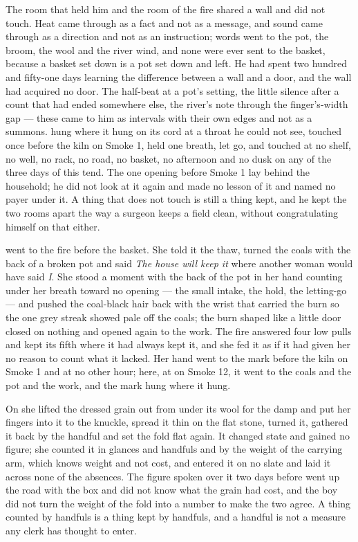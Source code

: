 The room that held him and the room of the fire shared a wall and did not touch. Heat came through as a fact and not as a message, and sound came through as a direction and not as an instruction; words went to the pot, the broom, the wool and the river wind, and none were ever sent to the basket, because a basket set down is a pot set down and left. He had spent two hundred and fifty-one days learning the difference between a wall and a door, and the wall had acquired no door. The half-beat at a pot's setting, the little silence after a count that had ended somewhere else, the river's note through the finger's-width gap --- these came to him as intervals with their own edges and not as a summons.  hung where it hung on its cord at a throat he could not see, touched once before the kiln on Smoke 1, held one breath, let go, and touched at no shelf, no well, no rack, no road, no basket, no afternoon and no dusk on any of the three days of this tend. The one opening before Smoke 1 lay behind the household; he did not look at it again and made no lesson of it and named no payer under it. A thing that does not touch is still a thing kept, and he kept the two rooms apart the way a surgeon keeps a field clean, without congratulating himself on that either.

\scenebreak

 went to the fire before the basket. She told it the thaw, turned the coals with the back of a broken pot and said \emph{The house will keep it} where another woman would have said \emph{I}. She stood a moment with the back of the pot in her hand counting under her breath toward no opening --- the small intake, the hold, the letting-go --- and pushed the coal-black hair back with the wrist that carried the burn so the one grey streak showed pale off the coals; the burn shaped like a little door closed on nothing and opened again to the work. The fire answered four low pulls and kept its fifth where it had always kept it, and she fed it as if it had given her no reason to count what it lacked. Her hand went to the mark before the kiln on Smoke 1 and at no other hour; here, at  on Smoke 12, it went to the coals and the pot and the work, and the mark hung where it hung.

On  she lifted the dressed grain out from under its wool for the damp and put her fingers into it to the knuckle, spread it thin on the flat stone, turned it, gathered it back by the handful and set the fold flat again. It changed state and gained no figure; she counted it in glances and handfuls and by the weight of the carrying arm, which knows weight and not cost, and entered it on no slate and laid it across none of the absences. The figure spoken over it two days before went up the road with the box and did not know what the grain had cost, and the boy did not turn the weight of the fold into a number to make the two agree. A thing counted by handfuls is a thing kept by handfuls, and a handful is not a measure any clerk has thought to enter.


